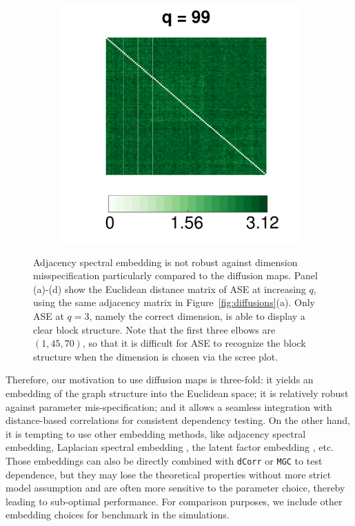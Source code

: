 \documentclass[12pt]{article}
\theoremstyle{definition}
\begin{document}
\begin{figure}[!ht]
\begin{subfigure}[b]{0.23\textwidth}
			\caption{}
			\label{fig:e10}
		\end{subfigure}
		\begin{subfigure}[b]{0.23\textwidth}
			\includegraphics[width=\textwidth]{../Figure/E99.pdf}
			\caption{}
			\label{fig:e99}
		\end{subfigure}
		\caption{Adjacency spectral embedding is not robust against dimension misspecification particularly compared to the diffusion maps. Panel (a)-(d) show the Euclidean distance matrix of ASE at increasing $q$, using the same adjacency matrix in Figure~\ref{fig:diffusions}(a). Only ASE at $q=3$, namely the correct dimension, is able to display a clear block structure. Note that the first three elbows are $(1,45,70)$, so that it is difficult for ASE to recognize the block structure when the dimension is chosen via the scree plot.}
		\label{fig:embedding}
	\end{figure}
	
	Therefore, our motivation to use diffusion maps is three-fold: it yields an embedding of the graph structure into the Euclidean space; it is relatively robust against parameter mis-specification; and it allows a seamless integration with distance-based correlations for consistent dependency testing. On the other hand, it is tempting to use other embedding methods, like adjacency spectral embedding, Laplacian spectral embedding \citep{rohe2011spectral}, the latent factor embedding \citep{fosdick2015testing}, etc. Those embeddings can also be directly combined with \texttt{dCorr} or \texttt{MGC} to test dependence, but they may lose the theoretical properties without more strict model assumption and are often more sensitive to the parameter choice, thereby leading to sub-optimal performance. For comparison purposes, we include other embedding choices for benchmark in the simulations.
	
\end{document}
